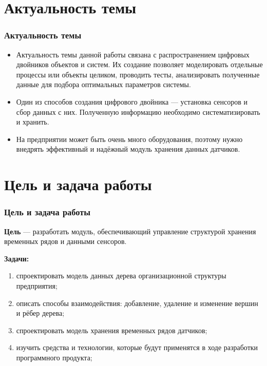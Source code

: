 \documentclass[pdf, hyperref={unicode}, aspectratio=169]{beamer}
\begin{document}

{
	\frame{\titlepage}
}


\section{Актуальность темы}
\begin{frame}
	\frametitle{Актуальность темы}
	\begin{itemize}
		\item Актуальность темы данной работы связана с распространением цифровых двойников объектов и систем. Их создание позволяет моделировать отдельные процессы или объекты целиком, проводить тесты, анализировать полученные данные для подбора оптимальных параметров системы.
		\item Один из способов создания цифрового двойника — установка сенсоров и сбор данных с них. Полученную информацию необходимо систематизировать и хранить.
		\item На предприятии может быть очень много оборудования, поэтому нужно внедрять эффективный и надёжный модуль хранения данных датчиков.
	\end{itemize}
\end{frame}


\section{Цель и задача работы}
\begin{frame}
	\frametitle{Цель и задача работы}
	
	\textbf{Цель} --- разработать модуль, обеспечивающий управление структурой хранения временных рядов и данными сенсоров.
	
	\textbf{Задачи:}
	\begin{enumerate}
		\item спроектировать модель данных дерева организационной структуры предприятия;
		\item описать способы взаимодействия: добавление, удаление и изменение вершин и рёбер дерева;
		\item спроектировать модель хранения временных рядов датчиков;
		\item изучить средства и технологии, которые будут применятся в ходе разработки программного продукта;
	\end{enumerate}
\end{frame}
\end{document}
